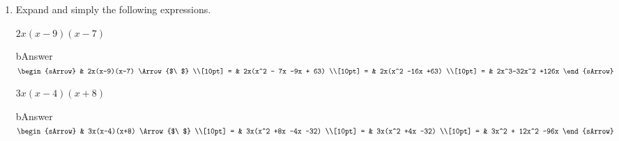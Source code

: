 \begin{enumerate}[resume]
  \item Expand and simply the following expressions.
  \begin{subtask}
    \task[] $2x(x-9)(x-7)$
              \begin{envOut}[equal height group=A-Rev-1]{bAnswer}
			       $\begin{sArrow}
			             & 2x(x-9)(x-7)        \Arrow{$\ $} \\[10pt]
                       = & 2x(x^2 - 7x -9x + 63)             \\[10pt]      
					   = & 2x(x^2 -16x +63)                 \\[10pt]
					   = & 2x^3-32x^2 +126x  
	                \end{sArrow}$
              \end{envOut}
    \task[] $3x(x-4)(x+8)$
              \begin{envOut}[equal height group=A-Rev-1]{bAnswer}
			       $\begin{sArrow}
			             & 3x(x-4)(x+8)        \Arrow{$\ $} \\[10pt]
                       = & 3x(x^2 +8x -4x -32)              \\[10pt]      
					   = & 3x(x^2 +4x -32)                  \\[10pt]
					   = & 3x^2 + 12x^2 -96x 
	                \end{sArrow}$
              \end{envOut}
  \end{subtask}

\end{enumerate}






